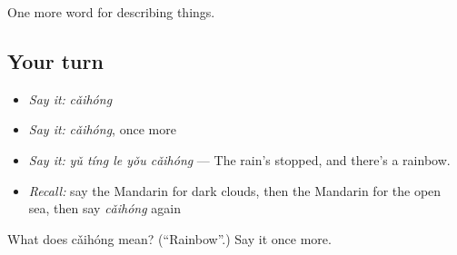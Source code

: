 \begin{grammarlens}[title={What you've built}]
One more word for describing things.
\end{grammarlens}

\subsection*{Your turn}
\begin{itemize}
\raggedright
  \item \emph{Say it:} \emph{cǎihóng}
  \item \emph{Say it:} \emph{cǎihóng}, once more
  \item \emph{Say it:} \emph{yǔ tíng le yǒu cǎihóng} — The rain's stopped, and there's a rainbow.
  \item \emph{Recall:} say the Mandarin for dark clouds, then the Mandarin for the open sea, then say \emph{cǎihóng} again
\end{itemize}

\begin{tcolorbox}[breakable,colback=teal!4,colframe=teal!35!black,title={Before you move on}]
What does cǎihóng mean? (\textquotedblleft{}Rainbow\textquotedblright{}.) Say it once more.
\end{tcolorbox}
